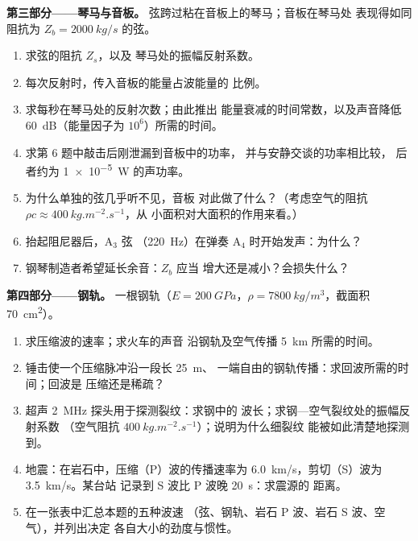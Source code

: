 \begin{problem}
\medskip
\noindent\textbf{第三部分——琴马与音板。}
弦跨过粘在音板上的琴马；音板在琴马处
表现得如同阻抗为 $Z_b = \qty{2000}{kg/s}$ 的弦。
\begin{enumerate}[resume]
  \item 求弦的阻抗 $Z_s$，以及
        琴马处的振幅反射系数。
  \item 每次反射时，传入音板的能量占波能量的
        比例。
  \item 求每秒在琴马处的反射次数；由此推出
        能量衰减的时间常数，以及声音降低
        \qty{60}{dB}（能量因子为 $10^6$）所需的时间。
  \item 求第 6 题中敲击后刚泄漏到音板中的功率，
        并与安静交谈的功率相比较，
        后者约为 \qty{1e-5}{W} 的声功率。
  \item 为什么单独的弦几乎听不见，音板
        对此做了什么？（考虑空气的阻抗
        $\rho c \approx \qty{400}{kg.m^{-2}.s^{-1}}$，从
        小面积对大面积的作用来看。）
  \item 抬起阻尼器后，A$_3$ 弦
        （\qty{220}{Hz}）在弹奏 A$_4$ 时开始发声：为什么？
  \item 钢琴制造者希望延长余音：$Z_b$ 应当
        增大还是减小？会损失什么？
\end{enumerate}

\medskip
\noindent\textbf{第四部分——钢轨。}
一根钢轨（$E = \qty{200}{GPa}$，$\rho = \qty{7800}{kg/m^3}$，截面积
        \qty{70}{cm^2}）。
\begin{enumerate}[resume]
  \item 求压缩波的速率；求火车的声音
        沿钢轨及空气传播 \qty{5}{km} 所需的时间。
  \item 锤击使一个压缩脉冲沿一段长 \qty{25}{m}、
        一端自由的钢轨传播：求回波所需的时间；回波是
        压缩还是稀疏？
  \item 超声 \qty{2}{MHz} 探头用于探测裂纹：求钢中的
        波长；求钢—空气裂纹处的振幅反射系数
        （空气阻抗 $\qty{400}{kg.m^{-2}.s^{-1}}$）；说明为什么细裂纹
        能被如此清楚地探测到。
  \item 地震：在岩石中，压缩（P）波的传播速率为
        \qty{6.0}{km/s}，剪切（S）波为 \qty{3.5}{km/s}。某台站
        记录到 S 波比 P 波晚 \qty{20}{s}：求震源的
        距离。
  \item 在一张表中汇总本题的五种波速
        （弦、钢轨、岩石 P 波、岩石 S 波、空气），并列出决定
        各自大小的劲度与惯性。
\end{enumerate}
\end{problem}
